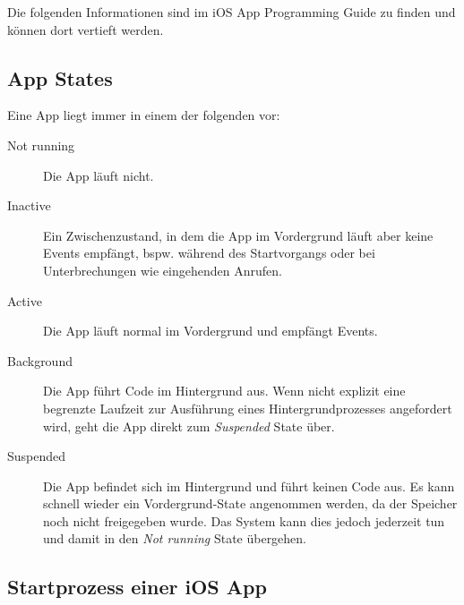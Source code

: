 \documentclass[parskip=half, final]{scrreprt}
\begin{document}
Die folgenden Informationen sind im iOS App Programming Guide  zu finden und können dort vertieft werden.

\subsection{App States}\label{sec:app_states}

Eine App liegt immer in einem der folgenden  vor:

\begin{description}
\item[Not running] Die App läuft nicht.
\item[Inactive] Ein Zwischenzustand, in dem die App im Vordergrund läuft aber keine Events empfängt, bspw. während des Startvorgangs oder bei Unterbrechungen wie eingehenden Anrufen.
\item[Active] Die App läuft normal im Vordergrund und empfängt Events.
\item[Background] Die App führt Code im Hintergrund aus. Wenn nicht explizit eine begrenzte Laufzeit zur Ausführung eines Hintergrundprozesses angefordert wird, geht die App direkt zum \emph{Suspended} State über.
\item [Suspended] Die App befindet sich im Hintergrund und führt keinen Code aus. Es kann schnell wieder ein Vordergrund-State angenommen werden, da der Speicher noch nicht freigegeben wurde. Das System kann dies jedoch jederzeit tun und damit in den \emph{Not running} State übergehen.
\end{description}

\subsection{Startprozess einer iOS App}\label{sec:launchprocess}
\end{document}
